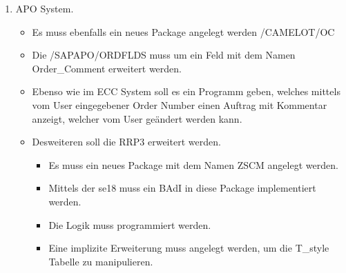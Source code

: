 \begin{enumerate}[itemsep=0em,partopsep=0em,parsep=0em,topsep=0em]
\begin{enumerate}
	\item APO System. 
		\begin{itemize}
		\item Es muss ebenfalls ein neues Package angelegt werden /CAMELOT/OC
		\item Die /SAPAPO/ORDFLDS muss um ein Feld mit dem Namen Order\_Comment erweitert werden.
		\item Ebenso wie im ECC System soll es ein Programm geben, welches mittels vom User eingegebener Order Number einen Auftrag mit Kommentar anzeigt, welcher vom User geändert werden kann.
		\item Desweiteren soll die RRP3 erweitert werden.
		\begin{itemize}
			\item Es muss ein neues Package mit dem Namen ZSCM angelegt werden.
			\item Mittels der se18 muss ein BAdI in diese Package implementiert werden.
			\item Die Logik muss programmiert werden.
			\item Eine implizite Erweiterung muss angelegt werden, um die T\_style Tabelle zu manipulieren.
		\end{itemize}
		\end{itemize}
	\end{enumerate}
\end{enumerate}
